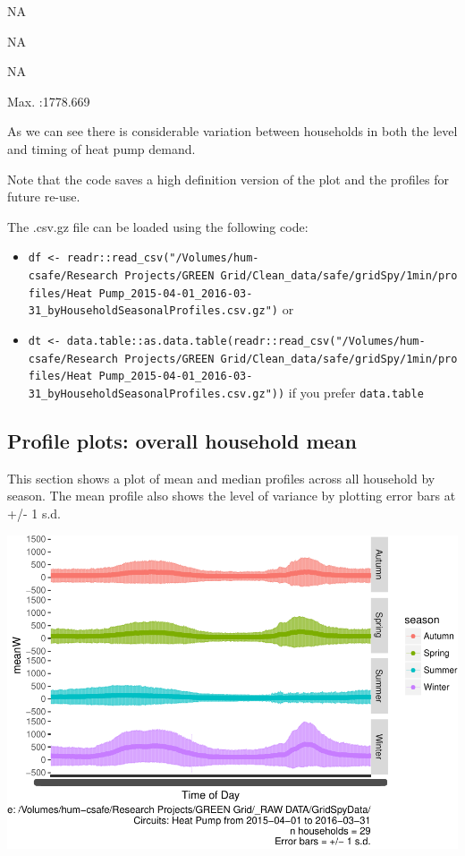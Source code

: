 \documentclass[]{article}
\providecommand{\tightlist}{%
  \setlength{\itemsep}{0pt}\setlength{\parskip}{0pt}}
\begin{document}
NA

NA

NA

Max. :1778.669

As we can see there is considerable variation between households in both
the level and timing of heat pump demand.

Note that the code saves a high definition version of the plot and the
profiles for future re-use.

The .csv.gz file can be loaded using the following code:

\begin{itemize}
\tightlist
\item
  \texttt{df\ \textless{}-\ readr::read\_csv("/Volumes/hum-csafe/Research\ Projects/GREEN\ Grid/Clean\_data/safe/gridSpy/1min/profiles/Heat\ Pump\_2015-04-01\_2016-03-31\_byHouseholdSeasonalProfiles.csv.gz")}
  or
\item
  \texttt{dt\ \textless{}-\ data.table::as.data.table(readr::read\_csv("/Volumes/hum-csafe/Research\ Projects/GREEN\ Grid/Clean\_data/safe/gridSpy/1min/profiles/Heat\ Pump\_2015-04-01\_2016-03-31\_byHouseholdSeasonalProfiles.csv.gz"))}
  if you prefer \texttt{data.table}
\end{itemize}

\subsection{Profile plots: overall household
mean}\label{profile-plots-overall-household-mean}

This section shows a plot of mean and median profiles across all
household by season. The mean profile also shows the level of variance
by plotting error bars at +/- 1 s.d.

\includegraphics{nzGGHouseholdPowerDemandProfile_Heat Pump_2015-04-01_2016-03-31_files/figure-latex/overall profiles by season-1.pdf}
\end{document}
